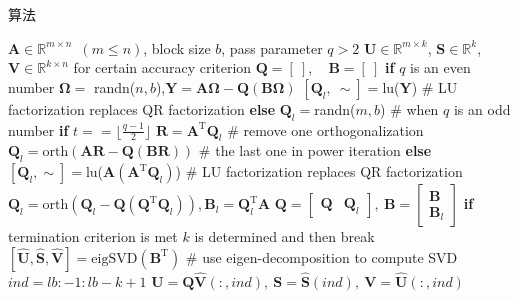 \documentclass[10pt]{beamer}
\begin{document}
\begin{frame}{算法}
  

  \begin{algorithm}[H]
     \scriptsize
  \begin{algorithmic}[1] %
    \REQUIRE $\mathbf{A}\in\mathbb{R}^{m\times n}$~$(m \le n)$, block size $b$, pass parameter $q > 2$
    \ENSURE $\mathbf{U}\in\mathbb{R}^{m\times k}$, $\mathbf{S}\in\mathbb{R}^k$, $\mathbf{V}\in\mathbb{R}^{k\times n}$ for certain accuracy criterion
      \STATE $\mathbf{Q} = [~ ]$, ~ $\mathbf{B} = [~ ]$
      \STATE \textbf{if} $q$ is an even number
        \STATE \quad\quad$\bm{\Omega}=$ randn($n,b$),$\mathbf{Y}=\mathbf{A}\bm{\Omega}-\mathbf{Q}(\mathbf{B}\bm{\Omega})$
        \STATE \quad\quad$[\mathbf{Q}_l, ~ \sim]=$lu($\mathbf{Y}$) \quad \quad \quad \quad \quad \quad \# LU factorization replaces QR factorization
      \STATE \textbf{else} 
        \STATE \quad\quad$\mathbf{Q}_l=$randn($m,b$) \quad \quad \quad \quad \quad \quad \# when $q$ is an odd number
        \STATE \textbf{if} $t==\lfloor\frac{q-1}{2}\rfloor$
          \STATE \quad\quad$\mathbf{R}=\mathbf{A}^\mathrm{T}\mathbf{Q}_l$ \quad \quad \quad \quad \quad \quad \quad \# remove one orthogonalization 
          \STATE \quad\quad$\mathbf{Q}_l= \mathrm{orth}(\mathbf{A}\mathbf{R}-\mathbf{Q}(\mathbf{B}\mathbf{R}))$ \quad \quad \# the last one in power iteration 
        \STATE \textbf{else}
          \STATE \quad\quad$[\mathbf{Q}_l, \sim] =$lu($\mathbf{A}(\mathbf{A}^\mathrm{T}\mathbf{Q}_l)$) \quad \quad \# LU factorization replaces QR factorization
      \ENDFOR
      \STATE $\mathbf{Q}_l = \mathrm{orth}(\mathbf{Q}_l-\mathbf{Q}(\mathbf{Q}^\mathrm{T}\mathbf{Q}_l)),\mathbf{B}_l=\mathbf{Q}_l^\mathrm{T}\mathbf{A}$
      \STATE $\mathbf{Q}=\begin{bmatrix}\mathbf{Q}&\mathbf{Q}_l\end{bmatrix}, ~ \mathbf{B}=\begin{bmatrix}\mathbf{B}\\\mathbf{B}_l\end{bmatrix}$
    \STATE \textbf{if} {termination criterion is met}
    \STATE \quad\quad$k$ is determined and then break
    \ENDFOR
  \STATE $[\mathbf{\hat{U}},\mathbf{\hat{S}},\mathbf{\hat{V}}] = \mathrm{eigSVD}(\mathbf{B^\mathrm{T}})$ \quad \quad \quad \quad \# use eigen-decomposition to compute SVD
    \STATE $ind=lb:-1:lb-k+1$
  \STATE $\mathbf{U}=\mathbf{Q}\mathbf{\hat{V}}(:, ind),  ~ \mathbf{S}=\mathbf{\hat{S}}(ind), ~ \mathbf{V}=\mathbf{\hat{U}}(:, ind)$
	\end{algorithmic}
\end{algorithm}


\end{frame}
\end{document}
